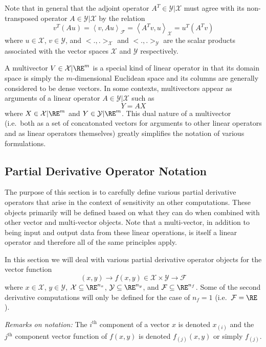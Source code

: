 \documentclass[pdf,ps2pdf,11pt]{SANDreport}
\begin{document}
Note that in general that the adjoint operator $A^T\in\mathcal{Y}|\mathcal{X}$
must agree with its non-transposed operator $A\in\mathcal{Y}|\mathcal{X}$ by
the relation
%
\[
v^T ( A u ) = \left< v, A u \right>_{\mathcal{F}} = \left< A^T v, u \right>_{\mathcal{X}} = u^T (A^T v)
\]
%
where $u\in\mathcal{X}$, $v\in\mathcal{Y}$, and $<.,.>_{\mathcal{X}}$ and
$<.,.>_{\mathcal{Y}}$ are the scalar products associated with the vector
spaces $\mathcal{X}$ and $\mathcal{Y}$ respectively.

A multivector $V\in\mathcal{X}|\RE^{m}$ is a special kind of linear operator
in that its domain space is simply the $m$-dimensional Euclidean space and its
columns are generally considered to be dense vectors.  In some contexts,
multivectors appear as arguments of a linear operator
$A\in\mathcal{Y}|\mathcal{X}$ such as
%
\[
Y = A X
\]
%
where $X\in\mathcal{X}|\RE^m$ and $Y\in\mathcal{Y}|\RE^m$.  This dual nature
of a multivector (i.e.\ both as a set of concatonated vectors for arguments to
other linear operators and as linear operators themselves) greatly simplifies
the notation of various formulations.

\subsection{Partial Derivative Operator Notation}

The purpose of this section is to carefully define various partial derivative
operators that arise in the context of sensitivity an other computations.
These objects primarily will be defined based on what they can do when
combined with other vector and multi-vector objects.  Note that a
multi-vector, in addition to being input and output data from these linear
operations, is itself a linear operator and therefore all of the same
principles apply.

In this section we will deal with various partial derivative operator objects
for the vector function
%
\begin{equation}
(x,y) \rightarrow f(x,y) \in \mathcal{X} \times \mathcal{Y} \rightarrow \mathcal{F}
\end{equation}
%
where $x\in\mathcal{X}$, $y\in\mathcal{Y}$, $\mathcal{X}\subseteq\RE^{n_x}$,
$\mathcal{Y}\subseteq\RE^{n_y}$, and $\mathcal{F}\subseteq\RE^{n_f}$.  Some of
the second derivative computations will only be defined for the case of
$n_f=1$ (i.e.\ $\mathcal{F}=\RE$).

{}\textit{Remarks on notation:} The $i^{\mbox{th}}$ component of a vector $x$
is denoted $x_{(i)}$ and the $j^{\mbox{th}}$ component vector function of
$f(x,y)$ is denoted $f_{(j)}(x,y)$ or simply $f_{(j)}$.
\end{document}
